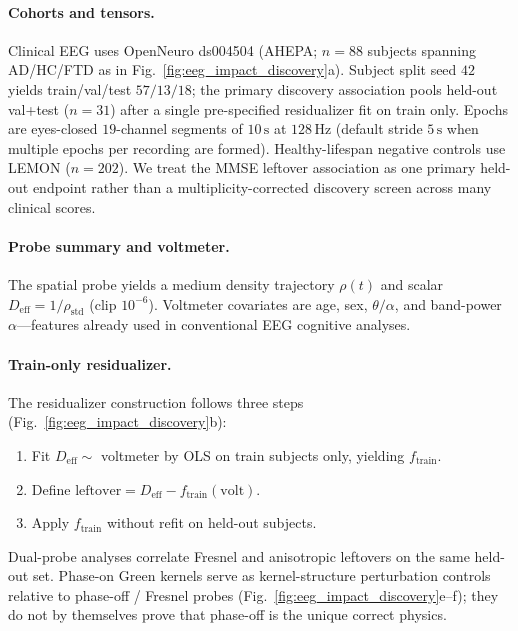\documentclass[twocolumn, 10pt]{article}
\begin{document}
\paragraph{Cohorts and tensors.}
Clinical EEG uses OpenNeuro ds004504 (AHEPA; \(n=88\) subjects spanning AD/HC/FTD as in Fig.~\ref{fig:eeg_impact_discovery}a)\cite{miltiadous2023}. Subject split seed \(42\) yields train/val/test \(57/13/18\); the primary discovery association pools held-out val+test (\(n=31\)) after a single pre-specified residualizer fit on train only. Epochs are eyes-closed \(19\)-channel segments of \(10\,\mathrm{s}\) at \(128\,\mathrm{Hz}\) (default stride \(5\,\mathrm{s}\) when multiple epochs per recording are formed). Healthy-lifespan negative controls use LEMON (\(n=202\))\cite{babayan2019}. We treat the MMSE leftover association as one primary held-out endpoint rather than a multiplicity-corrected discovery screen across many clinical scores.

\paragraph{Probe summary and voltmeter.}
The spatial probe yields a medium density trajectory \(\rho(t)\) and scalar \(D_{\mathrm{eff}}=1/\rho_{\mathrm{std}}\) (clip \(10^{-6}\)). Voltmeter covariates are age, sex, \(\theta/\alpha\), and band-power \(\alpha\)---features already used in conventional EEG cognitive analyses\cite{jeong2004}.

\paragraph{Train-only residualizer.}
The residualizer construction follows three steps (Fig.~\ref{fig:eeg_impact_discovery}b):

\begin{enumerate}
\item Fit \(D_{\mathrm{eff}}\sim\) voltmeter by OLS on train subjects only, yielding \(f_{\mathrm{train}}\).
\item Define \(\mathrm{leftover} = D_{\mathrm{eff}} - f_{\mathrm{train}}(\mathrm{volt})\).
\item Apply \(f_{\mathrm{train}}\) without refit on held-out subjects.
\end{enumerate}

Dual-probe analyses correlate Fresnel and anisotropic leftovers on the same held-out set. Phase-on Green kernels serve as kernel-structure perturbation controls relative to phase-off / Fresnel probes (Fig.~\ref{fig:eeg_impact_discovery}e--f); they do not by themselves prove that phase-off is the unique correct physics.
\end{document}
